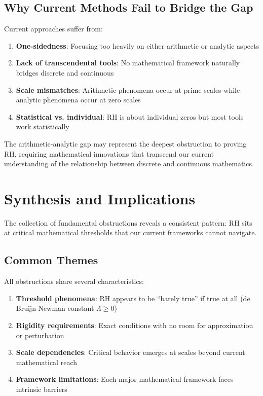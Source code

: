 \subsection{Why Current Methods Fail to Bridge the Gap}

Current approaches suffer from:

\begin{enumerate}
\item \textbf{One-sidedness}: Focusing too heavily on either arithmetic or analytic aspects
\item \textbf{Lack of transcendental tools}: No mathematical framework naturally bridges discrete and continuous
\item \textbf{Scale mismatches}: Arithmetic phenomena occur at prime scales while analytic phenomena occur at zero scales
\item \textbf{Statistical vs. individual}: RH is about individual zeros but most tools work statistically
\end{enumerate}

\begin{remark}
The arithmetic-analytic gap may represent the deepest obstruction to proving RH, requiring mathematical innovations that transcend our current understanding of the relationship between discrete and continuous mathematics.
\end{remark}

\section{Synthesis and Implications}
\label{sec:synthesis}

The collection of fundamental obstructions reveals a consistent pattern: RH sits at critical mathematical thresholds that our current frameworks cannot navigate.

\subsection{Common Themes}

All obstructions share several characteristics:

\begin{enumerate}
\item \textbf{Threshold phenomena}: RH appears to be ``barely true'' if true at all (de Bruijn-Newman constant $\Lambda \geq 0$)

\item \textbf{Rigidity requirements}: Exact conditions with no room for approximation or perturbation

\item \textbf{Scale dependencies}: Critical behavior emerges at scales beyond current mathematical reach

\item \textbf{Framework limitations}: Each major mathematical framework faces intrinsic barriers
\end{enumerate}


